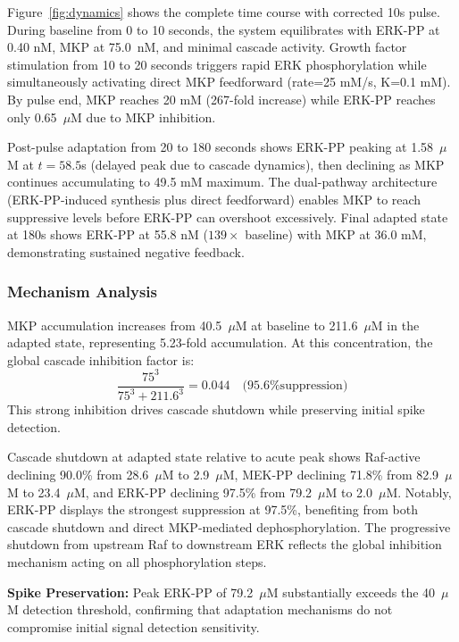 \documentclass[twocolumn,11pt]{article}
\newcommand{\erk}{ERK}
\newcommand{\mkp}{MKP}
\begin{document}
Figure~\ref{fig:dynamics} shows the complete time course with corrected 10s pulse. During baseline from 0 to 10 seconds, the system equilibrates with \erk{}-PP at 0.40 nM, \mkp{} at 75.0~nM, and minimal cascade activity. Growth factor stimulation from 10 to 20 seconds triggers rapid \erk{} phosphorylation while simultaneously activating direct \mkp{} feedforward (rate=25 mM/s, K=0.1 mM). By pulse end, \mkp{} reaches 20 mM (267-fold increase) while \erk{}-PP reaches only 0.65~$\mu$M due to \mkp{} inhibition.

Post-pulse adaptation from 20 to 180 seconds shows \erk{}-PP peaking at 1.58~$\mu$M at $t=58.5$s (delayed peak due to cascade dynamics), then declining as \mkp{} continues accumulating to 49.5 mM maximum. The dual-pathway architecture (\erk{}-PP-induced synthesis plus direct feedforward) enables \mkp{} to reach suppressive levels before \erk{}-PP can overshoot excessively. Final adapted state at 180s shows \erk{}-PP at 55.8 nM ($139\times$ baseline) with \mkp{} at 36.0 mM, demonstrating sustained negative feedback.

\subsubsection{Mechanism Analysis}

\mkp{} accumulation increases from 40.5~$\mu$M at baseline to 211.6~$\mu$M in the adapted state, representing 5.23-fold accumulation. At this concentration, the global cascade inhibition factor is:
\begin{equation}
\frac{75^3}{75^3 + 211.6^3} = 0.044 \quad \text{(95.6\% suppression)}
\end{equation}
This strong inhibition drives cascade shutdown while preserving initial spike detection.

Cascade shutdown at adapted state relative to acute peak shows Raf-active declining 90.0\% from 28.6~$\mu$M to 2.9~$\mu$M, MEK-PP declining 71.8\% from 82.9~$\mu$M to 23.4~$\mu$M, and \erk{}-PP declining 97.5\% from 79.2~$\mu$M to 2.0~$\mu$M. Notably, \erk{}-PP displays the strongest suppression at 97.5\%, benefiting from both cascade shutdown and direct \mkp{}-mediated dephosphorylation. The progressive shutdown from upstream Raf to downstream \erk{} reflects the global inhibition mechanism acting on all phosphorylation steps.

\textbf{Spike Preservation:} Peak \erk{}-PP of 79.2~$\mu$M substantially exceeds the 40~$\mu$M detection threshold, confirming that adaptation mechanisms do not compromise initial signal detection sensitivity.
\end{document}
